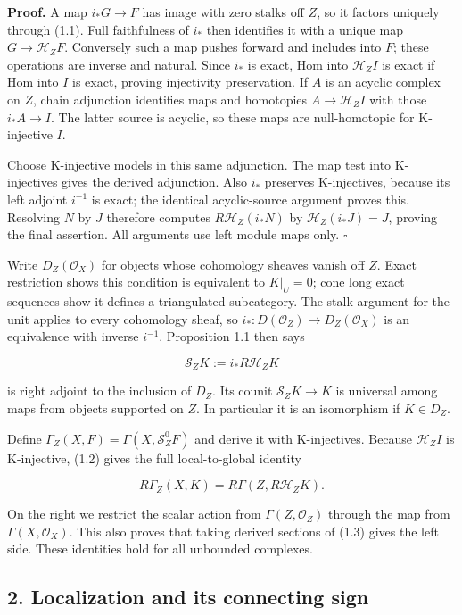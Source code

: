 \documentclass[
  english,
  11pt,
  a4paper,
]{article}
\begin{document}
\textbf{Proof.} A map \(i_*G\to F\) has image with zero stalks off
\(Z\), so it factors uniquely through (1.1). Full faithfulness of
\(i_*\) then identifies it with a unique map \(G\to\mathcal H_ZF\).
Conversely such a map pushes forward and includes into \(F\); these
operations are inverse and natural. Since \(i_*\) is exact, Hom into
\(\mathcal H_ZI\) is exact if Hom into \(I\) is exact, proving
injectivity preservation. If \(A\) is an acyclic complex on \(Z\), chain
adjunction identifies maps and homotopies \(A\to\mathcal H_ZI\) with
those \(i_*A\to I\). The latter source is acyclic, so these maps are
null-homotopic for K-injective \(I\).

Choose K-injective models in this same adjunction. The map test into
K-injectives gives the derived adjunction. Also \(i_*\) preserves
K-injectives, because its left adjoint \(i^{-1}\) is exact; the
identical acyclic-source argument proves this. Resolving \(N\) by \(J\)
therefore computes \(R\mathcal H_Z(i_*N)\) by \(\mathcal H_Z(i_*J)=J\),
proving the final assertion. All arguments use left module maps only.
\(\square\)

Write \(D_Z(\mathcal O_X)\) for objects whose cohomology sheaves vanish
off \(Z\). Exact restriction shows this condition is equivalent to
\(K|_U=0\); cone long exact sequences show it defines a triangulated
subcategory. The stalk argument for the unit applies to every cohomology
sheaf, so \(i_*:D(\mathcal O_Z)\to D_Z(\mathcal O_X)\) is an equivalence
with inverse \(i^{-1}\). Proposition 1.1 then says

\[\mathcal S_ZK:=i_*R\mathcal H_ZK
\tag{1.3}\]

is right adjoint to the inclusion of \(D_Z\). Its counit
\(\mathcal S_ZK\to K\) is universal among maps from objects supported on
\(Z\). In particular it is an isomorphism if \(K\in D_Z\).

Define \(\Gamma_Z(X,F)=\Gamma(X,\mathcal S_Z^0F)\) and derive it with
K-injectives. Because \(\mathcal H_ZI\) is K-injective, (1.2) gives the
full local-to-global identity

\[R\Gamma_Z(X,K)=R\Gamma(Z,R\mathcal H_ZK).
\tag{1.4}\]

On the right we restrict the scalar action from
\(\Gamma(Z,\mathcal O_Z)\) through the map from
\(\Gamma(X,\mathcal O_X)\). This also proves that taking derived
sections of (1.3) gives the left side. These identities hold for all
unbounded complexes.

\subsection{2. Localization and its connecting
sign}\label{sections-with-support-and-the-localization-triangle--2-localization-and-its-connecting-sign}
\end{document}
